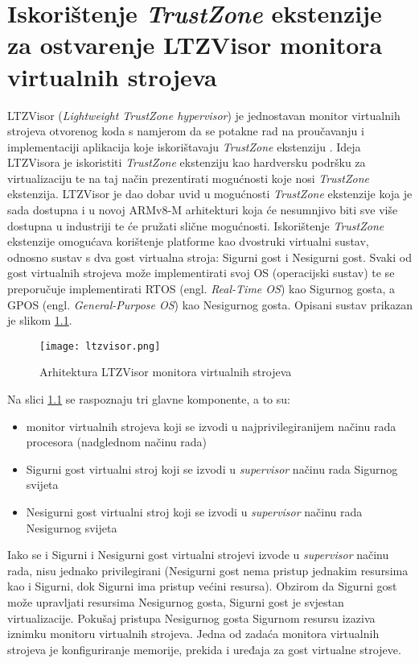 \documentclass[times, utf8, diplomski, numeric]{fer}
\begin{document}
\chapter{Iskorištenje \textit{TrustZone} ekstenzije za ostvarenje LTZVisor monitora virtualnih strojeva}
LTZVisor (\textit{Lightweight TrustZone hypervisor}) je jednostavan monitor virtualnih strojeva otvorenog koda s namjerom
da se potakne rad na proučavanju i implementaciji aplikacija koje iskorištavaju \textit{TrustZone} ekstenziju \cite{ltzvisor}.
Ideja LTZVisora je iskoristiti \textit{TrustZone} ekstenziju kao hardversku podršku za virtualizaciju te na taj način
prezentirati mogućnosti koje nosi \textit{TrustZone} ekstenzija. LTZVisor je dao dobar uvid u mogućnosti \textit{TrustZone}
ekstenzije koja je sada dostupna i u novoj ARMv8-M arhitekturi koja će nesumnjivo biti sve više dostupna u industriji te
će pružati slične mogućnosti. Iskorištenje \textit{TrustZone} ekstenzije omogućava korištenje platforme kao dvostruki virtualni
sustav, odnosno sustav s dva gost virtualna stroja: Sigurni gost i Nesigurni gost. Svaki od gost virtualnih strojeva može
implementirati svoj OS (operacijski sustav) te se preporučuje implementirati RTOS (engl. \textit{Real-Time OS}) kao
Sigurnog gosta, a GPOS (engl. \textit{General-Purpose OS}) kao Nesigurnog gosta.
Opisani sustav prikazan je slikom \ref{ltzvisor}.
\begin{figure}[H]
  \centering
	\texttt{[image: ltzvisor.png]}%
	\caption{Arhitektura LTZVisor monitora virtualnih strojeva \cite{ltzvisor}}
	\label{ltzvisor}%
\end{figure}
Na slici \ref{ltzvisor} se raspoznaju tri glavne komponente, a to su:
\begin{itemize}
  \item{monitor virtualnih strojeva koji se izvodi u najprivilegiranijem načinu rada procesora (nadglednom načinu rada)}
  \item{Sigurni gost virtualni stroj koji se izvodi u \textit{supervisor} načinu rada Sigurnog svijeta}
  \item{Nesigurni gost virtualni stroj koji se izvodi u \textit{supervisor} načinu rada Nesigurnog svijeta}
\end{itemize}
Iako se i Sigurni i Nesigurni gost virtualni strojevi izvode u \textit{supervisor} načinu rada, nisu jednako privilegirani
(Nesigurni gost nema pristup jednakim resursima kao i Sigurni, dok Sigurni ima pristup većini resursa). Obzirom da
Sigurni gost može upravljati resursima Nesigurnog gosta, Sigurni gost je svjestan virtualizacije. Pokušaj pristupa Nesigurnog
gosta Sigurnom resursu izaziva iznimku monitoru virtualnih strojeva.
Jedna od zadaća monitora virtualnih strojeva je konfiguriranje memorije, prekida i uređaja za gost virtualne strojeve.
\end{document}
